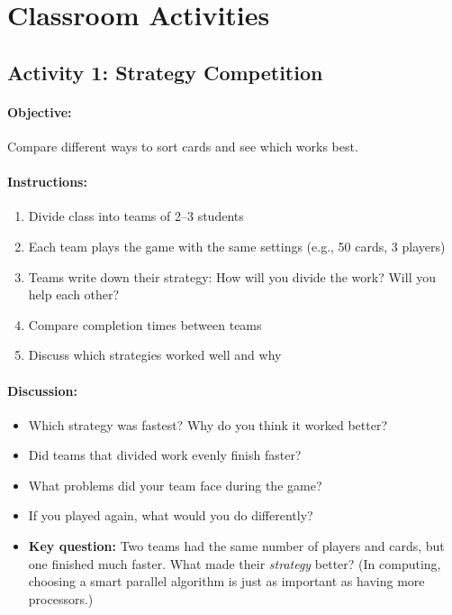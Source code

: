 \section{Classroom Activities}
\label{app:d:classroom-activities}

\subsection{Activity 1: Strategy Competition}

\paragraph{Objective:} Compare different ways to sort cards and see which works best.

\paragraph{Instructions:}
\begin{enumerate}
    \item Divide class into teams of 2--3 students
    \item Each team plays the game with the same settings (e.g., 50 cards, 3 players)
    \item Teams write down their strategy: How will you divide the work? Will you help each other?
    \item Compare completion times between teams
    \item Discuss which strategies worked well and why
\end{enumerate}

\paragraph{Discussion:}
\begin{itemize}
    \item Which strategy was fastest? Why do you think it worked better?
    \item Did teams that divided work evenly finish faster?
    \item What problems did your team face during the game?
    \item If you played again, what would you do differently?
    \item \textbf{Key question:} Two teams had the same number of players and cards, but one finished much faster. What made their \emph{strategy} better? (In computing, choosing a smart parallel algorithm is just as important as having more processors.)
\end{itemize}

